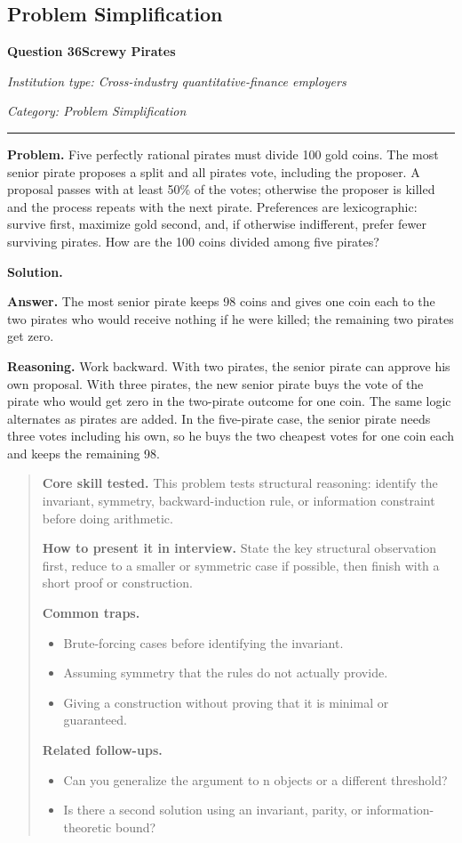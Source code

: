 \documentclass[11pt,letterpaper,openany]{book}
\newenvironment{EditorialNote}
  {\begin{quote}\small\setlength{\parskip}{0.25em}}
  {\end{quote}}
\newcommand{\QuestionSpacer}{\vspace{0.4em}}
\newcommand{\FoundationQuestionHeader}[3]{%
  \vspace{1.0em}%
  {\large\bfseries #1\enspace #2\par}%
  {\small\itshape Institution type: Cross-industry quantitative-finance employers\par}%
  {\small\itshape Category: #3\par}%
  \vspace{0.25em}\hrule\vspace{0.45em}%
}
\begin{document}
\subsection{Problem Simplification}

\FoundationQuestionHeader{Question 36}{Screwy Pirates}{Problem Simplification}

\textbf{Problem.} Five perfectly rational pirates must divide 100 gold coins. The most senior pirate proposes a split and all pirates vote, including the proposer. A proposal passes with at least 50\% of the votes; otherwise the proposer is killed and the process repeats with the next pirate. Preferences are lexicographic: survive first, maximize gold second, and, if otherwise indifferent, prefer fewer surviving pirates. How are the 100 coins divided among five pirates?


\textbf{Solution.}

\textbf{Answer.} The most senior pirate keeps 98 coins and gives one coin each to the two pirates who would receive nothing if he were killed; the remaining two pirates get zero.

\textbf{Reasoning.} Work backward. With two pirates, the senior pirate can approve his own proposal. With three pirates, the new senior pirate buys the vote of the pirate who would get zero in the two-pirate outcome for one coin. The same logic alternates as pirates are added. In the five-pirate case, the senior pirate needs three votes including his own, so he buys the two cheapest votes for one coin each and keeps the remaining 98.


\begin{EditorialNote}


\textbf{Core skill tested.} This problem tests structural reasoning: identify the invariant, symmetry, backward-induction rule, or information constraint before doing arithmetic.


\textbf{How to present it in interview.} State the key structural observation first, reduce to a smaller or symmetric case if possible, then finish with a short proof or construction.


\textbf{Common traps.}
\begin{itemize}
\item Brute-forcing cases before identifying the invariant.
\item Assuming symmetry that the rules do not actually provide.
\item Giving a construction without proving that it is minimal or guaranteed.
\end{itemize}


\textbf{Related follow-ups.}
\begin{itemize}
\item Can you generalize the argument to n objects or a different threshold?
\item Is there a second solution using an invariant, parity, or information-theoretic bound?
\end{itemize}


\end{EditorialNote}
\QuestionSpacer
\end{document}
